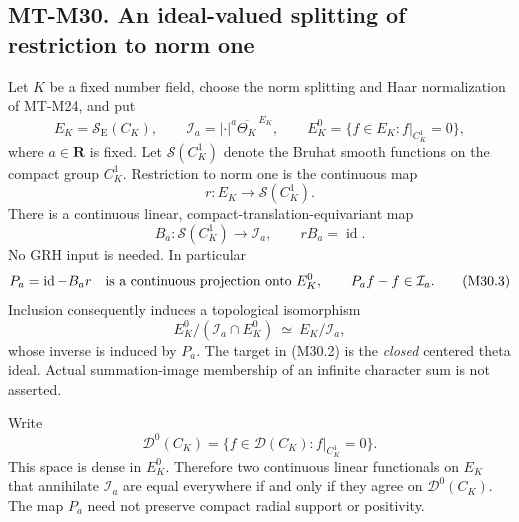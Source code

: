 \subsection*{MT-M30. An ideal-valued splitting of restriction to norm one}
Let \(K\) be a fixed number field, choose the norm splitting
and Haar normalization of MT-M24, and put
\[
 E_K=\mathcal S_{\mathrm E}(C_K),\qquad
 \mathcal I_a=|\cdot|^a\overline{\Theta_K}^{\,E_K},\qquad
 E_K^0=\{f\in E_K:f|_{C_K^1}=0\},
                                                               \tag{M30.1}
\]
where \(a\in\mathbf R\) is fixed. Let
\(\mathcal S(C_K^1)\) denote the Bruhat smooth functions on the
compact group \(C_K^1\). Restriction to norm one is the
continuous map
\[
                 r:E_K\longrightarrow\mathcal S(C_K^1).
 \]
There is a continuous linear, compact-translation-equivariant
map
\[
         B_a:\mathcal S(C_K^1)\longrightarrow\mathcal I_a,
                   \qquad rB_a=\operatorname{id}.             \tag{M30.2}
\]
No GRH input is needed. In particular
\[
 P_a=\operatorname{id}-B_ar
 \quad\hbox{is a continuous projection onto }E_K^0,\qquad
                   P_af-f\in\mathcal I_a.                    \tag{M30.3}
\]
Inclusion consequently induces a topological isomorphism
\[
        E_K^0/(\mathcal I_a\cap E_K^0)
                          \ \simeq\ E_K/\mathcal I_a,         \tag{M30.4}
\]
whose inverse is induced by \(P_a\).
The target in (M30.2) is the \emph{closed} centered
theta ideal. Actual summation-image membership of
an infinite character sum is not asserted.

Write
\[
         \mathcal D^0(C_K)
              =\{f\in\mathcal D(C_K):f|_{C_K^1}=0\}.
 \]
This space is dense in \(E_K^0\).
Therefore two continuous linear functionals on \(E_K\)
that annihilate \(\mathcal I_a\) are equal everywhere
if and only if they agree on \(\mathcal D^0(C_K)\).
The map \(P_a\) need not preserve compact radial
support or positivity.

